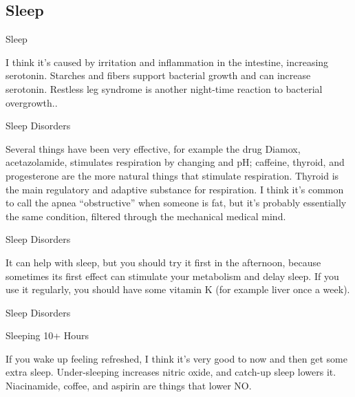 \documentclass[11pt,oneside,openany,extrafontsizes]{memoir}
\begin{document}
\subsection{Sleep}

\begin{standalonequote}{Sleep}

    \begin{answer}
        I think it's caused by irritation and inflammation in the intestine, increasing serotonin. Starches and fibers support bacterial growth and can increase serotonin. Restless leg syndrome is another night-time reaction to bacterial overgrowth..
    \end{answer}
\end{standalonequote}

\begin{standalonequote}{Sleep Disorders}

    \begin{answer}
        Several things have been very effective, for example the drug Diamox, acetazolamide, stimulates respiration by changing  and pH; caffeine, thyroid, and progesterone are the more natural things that stimulate respiration. Thyroid is the main regulatory and adaptive substance for respiration. I think it's common to call the apnea \enquote{obstructive} when someone is fat, but it's probably essentially the same condition, filtered through the mechanical medical mind.
    \end{answer}
\end{standalonequote}

\begin{standalonequote}{Sleep Disorders}

    \begin{answer}
        It can help with sleep, but you should try it first in the afternoon, because sometimes its first effect can stimulate your metabolism and delay sleep. If you use it regularly, you should have some vitamin K (for example liver once a week).
    \end{answer}
\end{standalonequote}

\begin{standalonequote}{Sleep Disorders}
    \begin{note}
        Sleeping 10+ Hours
    \end{note}

    \begin{answer}
        If you wake up feeling refreshed, I think it's very good to now and then get some extra sleep. Under-sleeping increases nitric oxide, and catch-up sleep lowers it. Niacinamide, coffee, and aspirin are things that lower NO.
    \end{answer}
\end{standalonequote}
\end{document}
